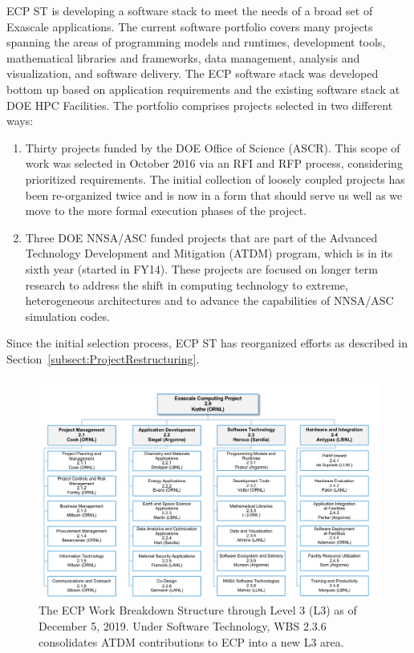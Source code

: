 ECP ST is developing a software stack to meet the needs of a broad set of Exascale applications. The current software portfolio covers many projects spanning the areas of programming models and runtimes, development tools, mathematical libraries and frameworks, data management, analysis and visualization, and software delivery. The ECP software stack was developed bottom up based on application requirements and the existing software stack at DOE HPC Facilities. The portfolio comprises projects selected in two different ways: 
\begin{enumerate}
\item Thirty projects funded by the DOE Office of Science (ASCR).  This scope of work was selected in October 2016 via an RFI and RFP process, considering prioritized requirements. The initial collection of loosely coupled projects has been re-organized twice and is now in a form that should serve us well as we move to the more formal execution phases of the project.
\item Three DOE NNSA/ASC funded projects that are part of the Advanced Technology Development and Mitigation (ATDM) program, which is in its sixth year (started in FY14). These projects are focused on longer term research to address the shift in computing technology to extreme, heterogeneous architectures and to advance the capabilities of NNSA/ASC simulation codes. 
\end{enumerate}
Since the initial selection process, ECP ST has reorganized efforts as described in Section~\ref{subsect:ProjectRestructuring}.

\begin{figure}
	\centering
	\includegraphics[width=0.9\linewidth]{ECP22}
	\caption{The ECP Work Breakdown Structure through Level 3 (L3) as of December 5, 2019. Under Software Technology, WBS 2.3.6 consolidates ATDM contributions to ECP into a new L3 area.}
	\label{fig:ecp2}
\end{figure}

